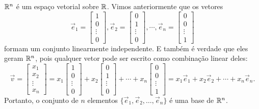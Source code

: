 \documentclass[../livro.tex]{subfiles}  %
\begin{document}
\begin{example}
	$\mathbb{R}^n$ é um espaço vetorial sobre $\mathbb{R}$. Vimos anteriormente que os vetores
	\[
	\vec{e}_1 =
	\left[
	\begin{array}{c}
	1 \\
	0 \\
	\vdots \\
	0
	\end{array}
	\right], \vec{e}_2 =
	\left[
	\begin{array}{c}
	0 \\
	1 \\
	\vdots \\
	0
	\end{array}
	\right], \cdots, \vec{e}_n =
	\left[
	\begin{array}{c}
	0 \\
	0 \\
	\vdots \\
	1
	\end{array}
	\right]
	\] formam um conjunto linearmente independente. E também é verdade que eles geram $\mathbb{R}^n$, pois qualquer vetor pode ser escrito como combinação linear deles:
	\[
	\vec{v} =
	\left[
	\begin{array}{c}
	x_1 \\
	x_2 \\
	\vdots \\
	x_n
	\end{array}
	\right] = x_1
	\left[
	\begin{array}{c}
	1 \\
	0 \\
	\vdots \\
	0
	\end{array}
	\right] + x_2
	\left[
	\begin{array}{c}
	0 \\
	1 \\
	\vdots \\
	0
	\end{array}
	\right] + \cdots + x_n
	\left[
	\begin{array}{c}
	0 \\
	0 \\
	\vdots \\
	1
	\end{array}
	\right] = x_1 \vec{e}_1 + x_2 \vec{e}_2 + \cdots + x_n \vec{e}_n.
	\] Portanto, o conjunto de $n$ elementos $\{\vec{e}_1, \vec{e}_2, \dots, \vec{e}_n\}$ é uma base de $\mathbb{R}^n$.
\end{example}
\end{document}
